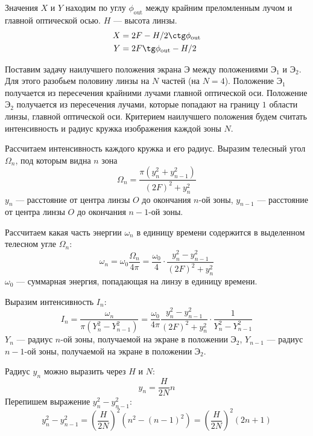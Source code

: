 \documentclass[a4paper, 12pt]{article}
\begin{document}
Значения $X$ и $Y$ находим по углу $\phi_\text{out}$ между крайним
преломленным лучом и главной оптической осью. $H$ --- высота
линзы.
\begin{equation}
    \begin{aligned}
        X &= 2F-H/2\ctg \phi_\text{out}\\
        Y &= 2F\tg \phi_\text{out} - H/2 
    \end{aligned}
    \label{eq:5}
\end{equation}

Поставим задачу наилучшего положения экрана $\text{Э}$ между
положениями $\text{Э}_1$ и $\text{Э}_2$. Для этого разобьем половину
линзы на $N$ частей (на  $N=4$). Положение $\text{Э}_1$
получается из пересечения крайними лучами главной оптической оси.
Положение $\text{Э}_2$ получается из пересечения лучами, которые
попадают на границу $1$ области линзы, главной
оптической оси. Критерием наилучшего положения будем считать
интенсивность и радиус кружка изображения каждой зоны $N$.

Рассчитаем интенсивность каждого кружка и его радиус. Выразим телесный
угол $\Omega_n$, под которым видна $n$ зона
\begin{equation}
    \Omega_n = \frac{\pi(y_n^2+y_{n-1}^2)}{(2F)^2+y_n^2}
    \label{eq:6}
\end{equation}
$y_n$ --- расстояние от центра линзы $O$ до окончания $n$-ой зоны,
$y_{n-1}$ --- расстояние от центра линзы $O$ до окончания $n-1$-ой
зоны.

Рассчитаем какая часть энергии $\omega_n$ в единицу времени содержится
в выделенном телесном угле
$\Omega_n$:
\begin{equation}
    \omega_n = \omega_0 \frac{\Omega_n}{4\pi} = \frac{\omega_0}{4}\cdot
    \frac{y_n^2-y_{n-1}^2}{(2F)^2+y_n^2}
    \label{eq:7}
\end{equation}
$\omega_0$ --- суммарная энергия, попадающая на линзу в единицу
времени.

Выразим интенсивность $I_n$:
\begin{equation}
    I_n = \frac{\omega_n}{\pi(Y_n^2-Y_{n-1}^2)} =
    \frac{\omega_0}{4\pi} \frac{y_n^2-y_{n-1}^2}{(2F)^2+y_n^2}\cdot
    \frac{1}{Y_n^2-Y_{n-1}^2}
    \label{eq:8}
\end{equation}
$Y_n$ --- радиус $n$-ой зоны, получаемой на экране в положении
$\text{Э}_2$, $Y_{n-1}$ ---
радиус $n-1$-ой зоны, получаемой на экране в положении $\text{Э}_2$.

Радиус $y_n$ можно выразить через $H$ и $N$:
\[
    y_n = \frac{H}{2 N} n
\]
Перепишем выражение $y_n^2-y_{n-1}^2$:
\[
    y_n^2-y_{n-1}^2 = \left( \frac{H}{2 N} \right)^2 (n^2-(n-1)^2) =
    \left( \frac{H}{2 N} \right)^2 (2n+1)
\]
\end{document}
